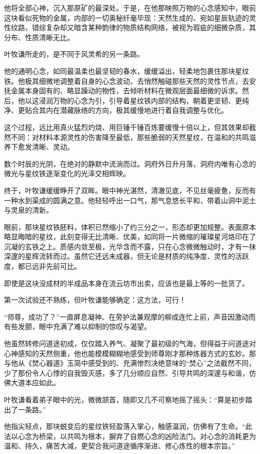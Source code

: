 他将全部心神，沉入那原矿的最深处。于是，在他那映照万物的心念感知中，眼前这块看似死物的金属，内部的一切奥秘纤毫毕现：天然生成的、宛如星辰轨迹的灵性纹路，错综复杂却又暗含某种韵律的物质结构网络，被视为瑕疵的细微杂质，其分布、性质清晰无比。

叶牧谦所走的，是不同于风灵希的另一条路。

他的通明心念，如同最温柔也最坚韧的春水，缓缓溢出，轻柔地包裹住那块星纹铁。他极其细微地调整着自身的心念波动，去悄然触碰那些天然的灵性节点，去安抚金属本身固有的、略显躁动的物性，去倾听材料在微观层面最细微的诉求。然后，他以这浸润万物的心念为引，引导着星纹铁内部的结构，朝着更坚韧、更纯净、更贴合其内在潜藏脉络的方向，极其缓慢地进行着自我调整与优化。

这个过程，远比用真火猛烈灼烧、用巨锤千锤百炼要缓慢十倍以上，但其效果却截然不同：对材料本源灵性的伤害降至最低，那些脆弱的天然星纹，在温和的共鸣滋养下愈发清晰、灵动。

数个时辰的光阴，在绝对的静默中流淌而过。洞府外日升月落，洞府内唯有心念的微光与星纹铁逐渐变化的光泽交相辉映。

终于，叶牧谦缓缓睁开了双眸。眼中神光湛然，清澈见底，不见丝毫疲惫，反而有一种水到渠成的圆满之意。他轻轻呼出一口气，那气息悠长平和，带着山洞中泥土与灵泉的清新。

眼前，那块星纹铁胚料，体积已然缩小了约三分之一，形态却更加规整。表面原本略显晦暗的星纹，此刻变得无比清晰、优美，如同将一片微缩的璀璨星河烙印在了沉凝的玄铁之上。质感内敛至极，光华含而不露，只在心念微微触动时，才有一抹深邃的星辉流转而过。虽然它还远未成器，但无论是材质的纯净度、灵性的活跃度，都已远非先前可比。

即使是这块没成材的半成品本身在流云坊市出卖，应该也是最上等的一批货了。

第一次试验还不熟练，但叶牧谦能够确定：这方法，可行！

“师尊，成功了？”一直屏息凝神、在旁护法兼观摩的柳成连忙上前，声音因激动而有些发颤，眼中充满了难以抑制的惊叹与渴望。

他虽然转修问道途初成，仅仅踏入养气、凝聚了最初级的气海，但得益于问道途对心神感知的天然侧重，他也能模模糊糊地感受到师尊刚才那种炼器方式的玄妙。那与他从《焚心器道》玉简中感受到的、充满惨烈决绝意味的“焚心”之法截然不同，少了那份令人心悸的自我毁灭感，多了几分顺应自然、引导共鸣的深邃与和谐，仿佛大道本应如此。

叶牧谦看着弟子眼中的光，微微颔首，随即又几不可察地摇了摇头：“算是初步踏出了一条路。”

他指尖轻点，那块蜕变后的星纹铁轻盈落入掌心，触感温润，仿佛有了生命。“此法以心念为桥梁，以共鸣为根本，摒弃了自燃心念的凶险法门。对心念的消耗更为温和、持久，痛苦大减，更契合我问道途循序渐进、修心炼性的根本宗旨。”

